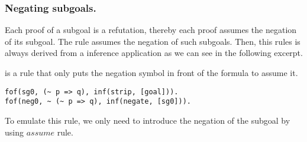 \documentclass[../../main.tex]{subfiles}
\begin{document}
\subsubsection{Negating subgoals.}
\label{sssec:negate}

Each proof of a subgoal is a refutation, thereby each proof assumes
the negation of its subgoal.
The \negate rule assumes the negation of such subgoals. Then, this rules
is always derived from a \strip inference application as we can see in
the following \TSTP excerpt.

\begin{myexample}
\negate is a rule that only puts the negation symbol
in front of the formula to assume it.

\begin{verbatim}
fof(sg0, (~ p => q), inf(strip, [goal])).
fof(neg0, ~ (~ p => q), inf(negate, [sg0])).
\end{verbatim}

\end{myexample}

To emulate this rule, we only need to introduce the negation
of the subgoal by using $assume$ rule.
\end{document}
